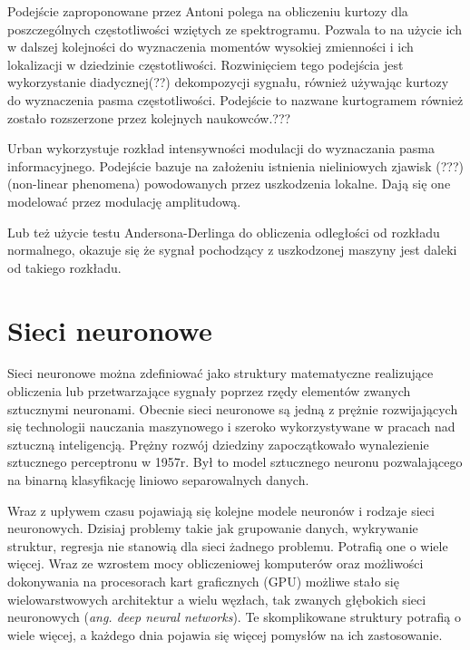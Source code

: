 \documentclass[inzynierska]{pwr_wmat_praca_dyplomowa}
\theoremstyle{plain}
\numberwithin{theorem}{chapter}
\theoremstyle{definition}
\numberwithin{theorem}{chapter}
\begin{document}
Podejście zaproponowane przez Antoni \cite{antoni} polega na obliczeniu kurtozy dla poszczególnych częstotliwości wziętych ze spektrogramu. Pozwala to na użycie ich w dalszej kolejności do wyznaczenia momentów wysokiej zmienności i ich lokalizacji w dziedzinie częstotliwości. Rozwinięciem tego podejścia jest wykorzystanie diadycznej(??) dekompozycji sygnału, również używając kurtozy do wyznaczenia pasma częstotliwości. Podejście to nazwane kurtogramem również zostało rozszerzone przez kolejnych naukowców.???\cite{antoni2}

Urban \cite{urban} wykorzystuje rozkład intensywności modulacji do wyznaczania pasma informacyjnego. Podejście bazuje na założeniu istnienia nieliniowych zjawisk (???) (non-linear phenomena) powodowanych przez uszkodzenia lokalne. Dają się one modelować przez modulację amplitudową. 

Lub też użycie testu Andersona-Derlinga do obliczenia odległości od rozkładu normalnego, okazuje się że sygnał pochodzący z uszkodzonej maszyny jest daleki od takiego rozkładu. \cite{wylomanska} 


\section{Sieci neuronowe}
Sieci neuronowe można zdefiniować jako struktury matematyczne realizujące obliczenia lub przetwarzające sygnały poprzez rzędy elementów zwanych sztucznymi neuronami.
Obecnie sieci neuronowe są jedną z prężnie rozwijających się technologii nauczania maszynowego i szeroko wykorzystywane w pracach nad sztuczną inteligencją.
Prężny rozwój dziedziny zapoczątkowało wynalezienie sztucznego perceptronu w 1957r. Był to model sztucznego neuronu pozwalającego na binarną klasyfikację liniowo separowalnych danych.

Wraz z upływem czasu pojawiają się kolejne modele neuronów i rodzaje sieci neuronowych. Dzisiaj problemy takie jak grupowanie danych, wykrywanie struktur, regresja nie stanowią dla sieci żadnego problemu. Potrafią one o wiele więcej. Wraz ze wzrostem mocy obliczeniowej komputerów oraz możliwości dokonywania na procesorach kart graficznych (GPU) możliwe stało się wielowarstwowych architektur a wielu węzłach, tak zwanych głębokich sieci neuronowych (\textit{ang. deep neural networks}). Te skomplikowane struktury potrafią o wiele więcej, a każdego dnia pojawia się więcej pomysłów na ich zastosowanie. 
\end{document}
